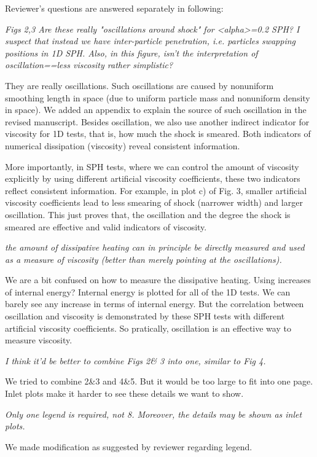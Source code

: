 \documentclass[10pt,a4paper]{article}
\begin{document}
Reviewer's questions are answered separately in following: 

\textit{Figs 2,3 Are these really "oscillations around shock" for <alpha>=0.2 SPH? I suspect that instead we have inter-particle penetration, i.e.
particles swapping positions in 1D SPH. Also, in this figure, isn't the interpretation of oscillation==less viscosity rather simplistic? }

They are really oscillations. Such oscillations are caused by nonuniform smoothing length in space (due to uniform particle mass and nonuniform density in space). We added an appendix to explain the source of such oscillation in the revised manuscript.
Besides oscillation, we also use another indirect indicator for viscosity for 1D tests, that is, how much the shock is smeared. Both indicators of numerical dissipation (viscosity) reveal consistent information. 

More importantly, in SPH tests, where we can control the amount of viscosity explicitly by using different artificial viscosity coefficients, these two indicators reflect consistent information. For example, in plot c) of Fig. 3, smaller artificial viscosity coefficients lead to less smearing of shock (narrower width) and larger oscillation. This just proves that, the oscillation and the degree the shock is smeared are effective and valid indicators of viscosity.

\textit{the amount of dissipative heating can in principle be directly measured and used as a measure of viscosity (better than merely pointing at the oscillations).}  

We are a bit confused on how to measure the dissipative heating. Using increases of internal energy? Internal energy is plotted for all of the 1D tests. We can barely see any increase in terms of internal energy. But the correlation between oscillation and viscosity is demonstrated by these SPH tests with different artificial viscosity coefficients. So pratically, oscillation is an effective way to measure viscosity.

\textit{I think it'd be better to combine Figs 2\& 3 into one, similar to Fig 4.}

We tried to combine 2\&3 and 4\&5. But it would be too large to fit into one page. Inlet plots make it harder to see these details we want to show.

\textit{Only one legend is required, not 8. Moreover, the details may be shown as inlet plots.} 

We made modification as suggested by reviewer regarding legend.
\\[3pt]
\end{document}
